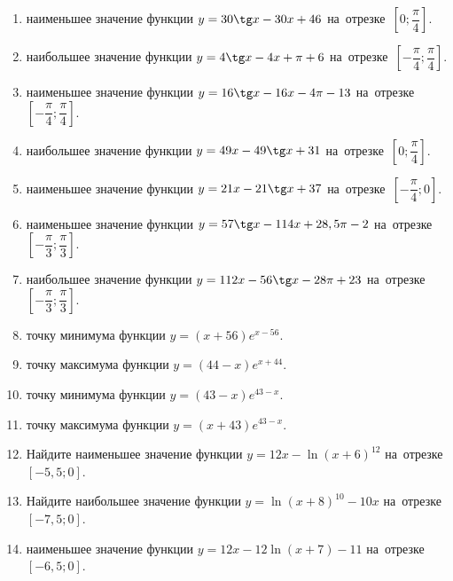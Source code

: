 \documentclass[a4paper,10pt]{article}
\begin{document}
\begin{enumerate}
\item {} наименьшее значение функции $y = 30\tg x-30x+46$ на~отрезке~$\left[0;\dfrac{\pi }{4}\right]$.

\item {} наибольшее значение функции $y=4\tg x-4x+\pi +6$ на~отрезке~$\left[-\dfrac{\pi }{4};\dfrac{\pi }{4}\right]$.

\item {} наименьшее значение функции $y=16\tg x-16x-4\pi -13$ на~отрезке~$\left[-\dfrac{\pi }{4};\dfrac{\pi }{4}\right]$.

\item {} наибольшее значение функции $y = 49x-49\tg x +31$ на~отрезке~$\left[0;\dfrac{\pi }{4}\right]$.

\item {} наименьшее значение функции $y = 21x-21\tg x +37$ на~отрезке~$\left[-\dfrac{\pi }{4};0\right]$.

\item {} наименьшее значение функции $y = 57\tg x-114x+28,5 \pi -2$ на~отрезке~$\left[-\dfrac{\pi }{3};\dfrac{\pi }{3}\right]$.

\item {} наибольшее значение функции $y = 112x-56\tg x-28\pi +23$ на~отрезке~$\left[-\dfrac{\pi }{3};\dfrac{\pi }{3}\right]$.

\item {} точку минимума функции $y = \left(x+56\right)e^{x-56}$.

\item {} точку максимума функции $y = \left(44-x\right)e^{x+44}$.

\item {} точку минимума функции $y = \left(43-x\right)e^{43-x}$.

\item {} точку максимума функции $y = \left(x+43\right)e^{43-x}$.

\item Найдите наименьшее значение функции $y = 12x-\ln \left(x+6\right)^{12}$ на~отрезке~$\left[-5,5;0\right]$.

\item Найдите наибольшее значение функции $y = \ln \left(x+8\right)^{10}-10x$ на~отрезке~$\left[-7,5;0\right]$.

\item {} наименьшее значение функции $y = 12x-12\ln \left(x+7\right) -11$ на~отрезке~$\left[-6,5;0\right]$.


\end{enumerate}
\end{document}
